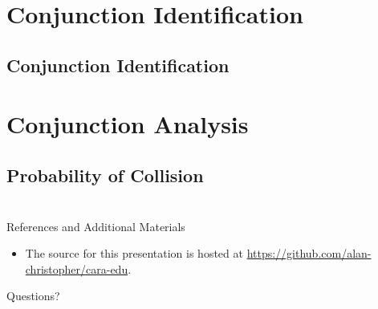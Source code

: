\documentclass[pdf]{beamer}
\makeatletter
\def\beamer@writeslidentry@miniframesoff{%
  \expandafter\beamer@ifempty\expandafter{\beamer@framestartpage}{}%
  {%
    \clearpage\beamer@notesactions%
  }
}
\newcommand*{\miniframesoff}{\let\beamer@writeslidentry=\beamer@writeslidentry@miniframesoff}
\makeatother
\begin{document}
\section{Conjunction Identification}
\subsection{Conjunction Identification}


\section{Conjunction Analysis}
\subsection{Probability of Collision}

\miniframesoff
\section*{}
\begin{frame}{References and Additional Materials}
  \begin{itemize}
  \item The source for this presentation is hosted at
    \url{https://github.com/alan-christopher/cara-edu}.
  \end{itemize}
\end{frame}

\begin{frame}{Questions?}
\end{frame}
\end{document}
